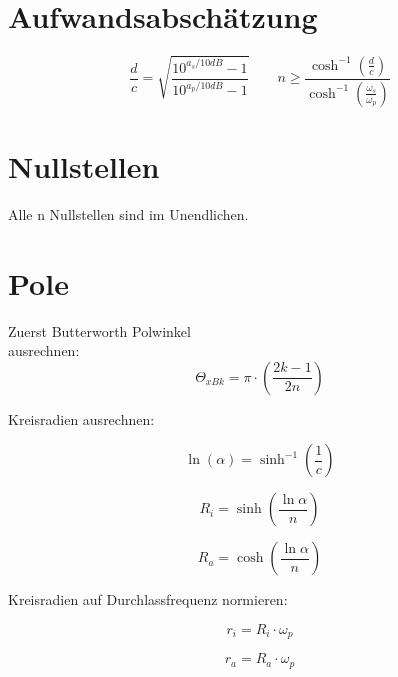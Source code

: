 \documentclass[a4paper, 12pt]{report}
\begin{document}
\begin{minipage}[t]{0.6\textwidth}
	\section*{Aufwandsabschätzung}
		\[ \frac{d}{c} = \sqrt{\frac{10^{a_s/10dB} - 1}{10^{a_p/10dB} - 1}} \qquad n \ge \frac{\cosh^{-1}{\left(\frac{d}{c}\right)}}{\cosh^{-1}{\left(\frac{\omega_s}{\omega_p}\right)}} \]

\end{minipage}
\begin{minipage}[t]{0.3\textwidth}
	\section*{Nullstellen}
		Alle n Nullstellen sind im Unendlichen.
\end{minipage}
   	
	
\section*{Pole}
	Zuerst Butterworth Polwinkel \\ ausrechnen:		
	\[ \varTheta_{xBk} = \pi \cdot \left( \frac{2k-1}{2n} \right)  \]
	
	Kreisradien ausrechnen:
	
	\begin{minipage}[t]{0.33\textwidth}
		\vspace{-0.5cm}   	
		\[ \ln{(\alpha)} = \sinh^{-1}{\left(\frac{1}{c}\right)} \]
	\end{minipage}
   	\begin{minipage}[t]{0.33\textwidth}
		\[ R_i = \sinh{\left(\frac{\ln{\alpha}}{n}\right)} \]
   	\end{minipage}
   	\begin{minipage}[t]{0.33\textwidth}
		\[ R_a = \cosh{\left(\frac{\ln{\alpha}}{n}\right)} \]
   	\end{minipage}

	\vspace{0.3cm}   	
	Kreisradien auf Durchlassfrequenz normieren:
	
	\begin{minipage}[t]{0.5\textwidth}
		\[ r_i = R_i \cdot \omega_p \]
	\end{minipage}
   	\begin{minipage}[t]{0.5\textwidth}
		\[ r_a = R_a \cdot \omega_p \]
   	\end{minipage}
   	
\end{document}
